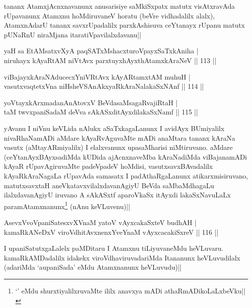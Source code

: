 \begin{artha}
tananx AtamxjAcnxnavanunx anusarisiye saMkiSxpatx matutx visAtxravAda rUpavanunx Atamxnu hoMdiruvaneV horatu (beVre vidhadalilx alalx), AtamxnAdarU tananx savxrUpadalilx parxkAshisuva ceYtanayx rUpanu matutx pUNaRnU niraMjana itaratiVpavilalxdavanu||
\end{artha}

\begin{shl}
yaH sa EtAMsatxvXyA paqSATxMshacxturoV\s payxSaTxkAniha |\\
niruhayx kAyaRtAM niVtAvx parxtuyxhAyxthA\s \s tamxkAraNeV \hfill || 113 ||
\end{shl}

\begin{shl}
viBajayxkAraNAducecxYniVRtAvx kAyARtamxtAM muhuH |\\
vasutxvaqtetxVna niHsheVSAnAkxyaRkAraNalakaSxNAnf \hfill || 114 ||
\end{shl}

\begin{shl}
yoV\s tayxkArxmadanAnAtovxV BeVdasaMsagaRvajiRtaH |\\
taM twvxpaniSadaM deVva sAkASxditAyxdilakaSxNamf \hfill || 115 ||
\end{shl}

\begin{artha}
yAvanu I niVnu keVLida nAlukx aSaTxkagaLanunx I avidAyx BUmiyalilx nivaRhaNamADi aMdare kAyaRvAguvaMte mADi anaMtara tananx kAraNa vasutx (aMtayARmiyalilx) I elalxvanunx upasaMharisi niMtiruvano. aMdare (ceYtanAyxBAyxsadiMda kUDida ajAcnxnaveMba kAraNadiMda viBajanamADi kAyaR rUpavAgiruvaMte padeVpadeV hoMdisi, vasutxsavxBAvadalilx kAyaRkAraNagaLa rUpavAda samasatx I padAthaRgaLanunx atikarxmisiruvano, matutxsavxtaH aneVkatavxvilalxdavanAgiyU BeVda saMbaMdhagaLu ilalxdavanAgiyU iruvano A sAkASxtf aparoVkaSx itAyxdi lakaSxNavuLaLx paramAtamxnanunx\footnote[1]{`\stext ' eMdu shurxtiyalilxruvaMte ililx anavxya mADi athaRmADikoLaLxbeVku||} (nAnu keVLuvenu)||
\end{artha}%


\begin{shl}
AsevxVvoVpaniSatesxvXVnaM yatoV vAyxcakaSxteV budhAH |\\
kamaRkANeDxV viroVdhitAvxnenxYveYnaM vAyxcacakiSxreV \hfill || 116 ||
\end{shl}

\begin{artha}
I upaniSatutxgaLalelx paMDitaru I Atamxnu tiLiyuvaneMdu heVLuvaru. kamaRkAMDadalilx idakekx viroVdhaviruvadariMda Itananunx heVLuvudilalx (adariMda `aupaniSada' eMdu Atamxnanunx heVLuvudu)||
\end{artha}

